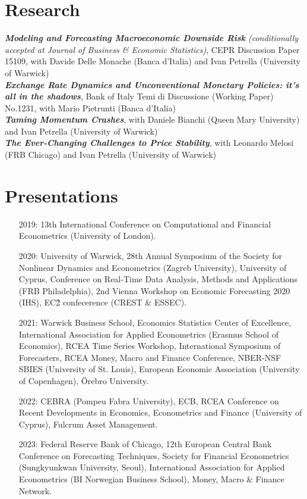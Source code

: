 \documentclass[a4paper,12pt]{article}
\begin{document}
\section{Research}
\textit{\textbf{Modeling and Forecasting Macroeconomic Downside Risk} (\emph{conditionally accepted at} Journal of Business \& Economic Statistics)}, CEPR Discussion Paper 15109, with Davide Delle Monache (Banca d'Italia) and Ivan Petrella (University of Warwick)\\[.5em]
\textit{\textbf{Exchange Rate Dynamics and Unconventional Monetary Policies: it’s all in the shadows}}, Bank of Italy Temi di Discussione (Working Paper) No.1231, with Mario Pietrunti (Banca d'Italia)\\[.5em]
\textit{\textbf{Taming Momentum Crashes}}, with Daniele Bianchi (Queen Mary University) and Ivan Petrella (University of Warwick)\\[.5em]
\textit{\textbf{The Ever-Changing Challenges to Price Stability}}, with Leonardo Melosi (FRB Chicago) and Ivan Petrella (University of Warwick)

\section{Presentations}
\begin{itemize}
    \item[2019:] 13th International Conference on Computational and Financial Econometrics (University of London).
    \item[2020:] University of Warwick, 28th Annual Symposium of the Society for Nonlinear Dynamics and Econometrics (Zagreb University), University of Cyprus, Conference on Real-Time Data Analysis, Methods and Applications (FRB Philadelphia), 2nd Vienna Workshop on Economic Forecasting 2020 (IHS), EC\^2 confecerence (CREST \& ESSEC).
    \item[2021:] Warwick Business School, Economics Statistics Center of Excellence, International Association for Applied Econometrics (Erasmus School of Economics),  RCEA Time Series Workshop, International Symposium of Forecasters,  RCEA Money, Macro and Finance Conference, NBER-NSF SBIES (University of St. Louis), European Economic Association (University of Copenhagen), \"Orebro University.
    \item[2022:] CEBRA (Pompeu Fabra University), ECB, RCEA Conference on Recent Developments in Economics, Econometrics and Finance (University of Cyprus), Fulcrum Asset Management.
    \item[2023:] Federal Reserve Bank of Chicago, 12th European Central Bank Conference on Forecasting Techniques, Society for Financial Econometrics (Sungkyunkwan University, Seoul), International Association for Applied Econometrics (BI Norwegian Business School), Money, Macro \& Finance Network. 
\end{itemize}
\end{document}
